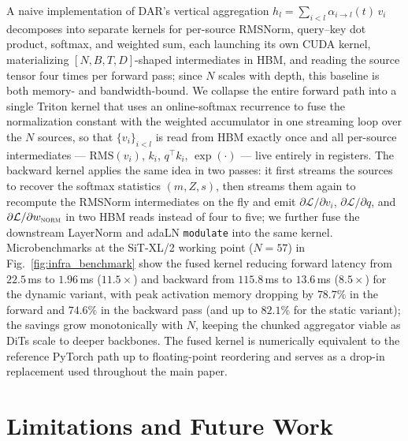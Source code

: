 \documentclass{llmxive}
\begin{document}
A naive implementation of \textsc{DAR}'s vertical aggregation $h_l = \sum_{i<l} \alpha_{i\to l}(t)\,v_i$ decomposes into separate kernels for per-source RMSNorm, query--key dot product, softmax, and weighted sum, each launching its own CUDA kernel, materializing $[N, B, T, D]$-shaped intermediates in HBM, and reading the source tensor four times per forward pass; since $N$ scales with depth, this baseline is both memory- and bandwidth-bound. We collapse the entire forward path into a single Triton kernel that uses an online-softmax recurrence to fuse the normalization constant with the weighted accumulator in one streaming loop over the $N$ sources, so that $\{v_i\}_{i<l}$ is read from HBM exactly once and all per-source intermediates --- $\mathrm{RMS}(v_i)$, $k_i$, $q^{\top}k_i$, $\exp(\cdot)$ --- live entirely in registers. The backward kernel applies the same idea in two passes: it first streams the sources to recover the softmax statistics $(m, Z, s)$, then streams them again to recompute the RMSNorm intermediates on the fly and emit $\partial\mathcal{L}/\partial v_i$, $\partial\mathcal{L}/\partial q$, and $\partial\mathcal{L}/\partial w_{\textsc{norm}}$ in two HBM reads instead of four to five; we further fuse the downstream LayerNorm and adaLN \texttt{modulate} into the same kernel. Microbenchmarks at the SiT-XL/2 working point ($N=57$) in Fig.~\ref{fig:infra_benchmark} show the fused kernel reducing forward latency from $22.5$\,ms to $1.96$\,ms ($11.5\times$) and backward from $115.8$\,ms to $13.6$\,ms ($8.5\times$) for the dynamic variant, with peak activation memory dropping by $78.7\%$ in the forward and $74.6\%$ in the backward pass (and up to $82.1\%$ for the static variant); the savings grow monotonically with $N$, keeping the chunked aggregator viable as DiTs scale to deeper backbones. The fused kernel is numerically equivalent to the reference PyTorch path up to floating-point reordering and serves as a drop-in replacement used throughout the main paper.

\section{Limitations and Future Work}
\label{limitations}
\end{document}
